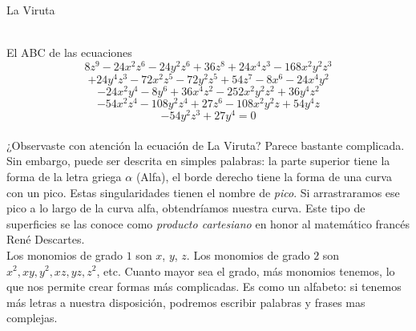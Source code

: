 \documentclass[es]{SurferDesc}%
\begin{document}
\footnotesize




\begin{surferPage}
  \begin{surferTitle}La Viruta\end{surferTitle} \\
El ABC de las ecuaciones
\[8z^9-24x^2z^6-24y^2z^6+36z^8+24x^4z^3-168x^2y^2z^3\]
\[+24y^4z^3-72x^2z^5-72y^2z^5+54z^7-8x^6-24x^4y^2\]
\[-24x^2y^4-8y^6 + 36x^4z^2-252x^2y^2z^2+36y^4z^2\]
\[- 54x^2z^4-108y^2z^4 + 27z^6-108x^2y^2z + 54y^4z\]
\[-54y^2z^3 + 27y^4 = 0\]\\
\vspace{0.25cm}
¿Observaste con atención la ecuación de La Viruta? Parece bastante complicada.
Sin embargo, puede ser descrita en simples palabras: la parte superior tiene la forma de la letra griega $\alpha$ (Alfa), el borde derecho tiene la forma de una curva con un pico. Estas singularidades tienen el nombre de {\it pico}. Si arrastraramos ese pico a lo largo de la curva alfa, obtendríamos nuestra curva. Este tipo de superficies se las conoce como {\it producto cartesiano} en honor al matemático francés Ren\'e Descartes.\\
\vspace{0.25cm}
Los monomios de grado $1$ son $x$, $y$, $z$. Los monomios de grado $2$ son $x^2, xy, y^2, xz, yz, z^2$, etc. Cuanto mayor sea el grado, más monomios tenemos, lo que nos permite crear formas más complicadas. Es como un alfabeto: si tenemos más letras a nuestra disposición, podremos escribir palabras y frases mas complejas. 




  \begin{surferText}
     \end{surferText}
\end{surferPage}
\end{document}
